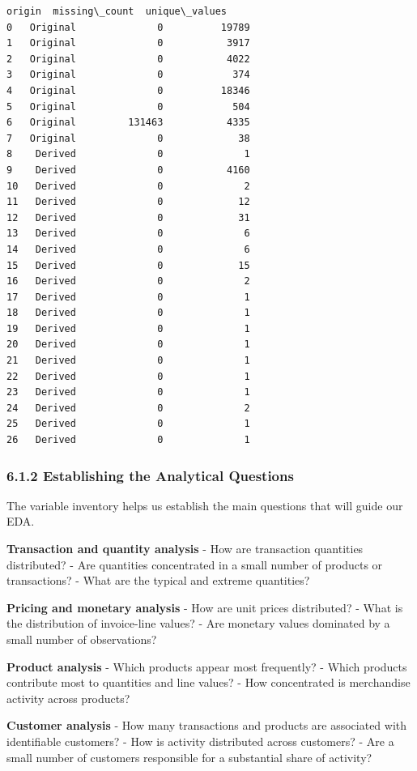 \documentclass[11pt]{article}
\begin{document}
\begin{Verbatim}[commandchars=\\\{\}]
      origin  missing\_count  unique\_values  
0   Original              0          19789  
1   Original              0           3917  
2   Original              0           4022  
3   Original              0            374  
4   Original              0          18346  
5   Original              0            504  
6   Original         131463           4335  
7   Original              0             38  
8    Derived              0              1  
9    Derived              0           4160  
10   Derived              0              2  
11   Derived              0             12  
12   Derived              0             31  
13   Derived              0              6  
14   Derived              0              6  
15   Derived              0             15  
16   Derived              0              2  
17   Derived              0              1  
18   Derived              0              1  
19   Derived              0              1  
20   Derived              0              1  
21   Derived              0              1  
22   Derived              0              1  
23   Derived              0              1  
24   Derived              0              2  
25   Derived              0              1  
26   Derived              0              1  
    \end{Verbatim}

    
    \subsubsection{6.1.2 Establishing the Analytical
Questions}\label{establishing-the-analytical-questions}

The variable inventory helps us establish the main questions that will
guide our EDA.

\textbf{Transaction and quantity analysis} - How are transaction
quantities distributed? - Are quantities concentrated in a small number
of products or transactions? - What are the typical and extreme
quantities?

\textbf{Pricing and monetary analysis} - How are unit prices
distributed? - What is the distribution of invoice-line values? - Are
monetary values dominated by a small number of observations?

\textbf{Product analysis} - Which products appear most frequently? -
Which products contribute most to quantities and line values? - How
concentrated is merchandise activity across products?

\textbf{Customer analysis} - How many transactions and products are
associated with identifiable customers? - How is activity distributed
across customers? - Are a small number of customers responsible for a
substantial share of activity?
\end{document}
